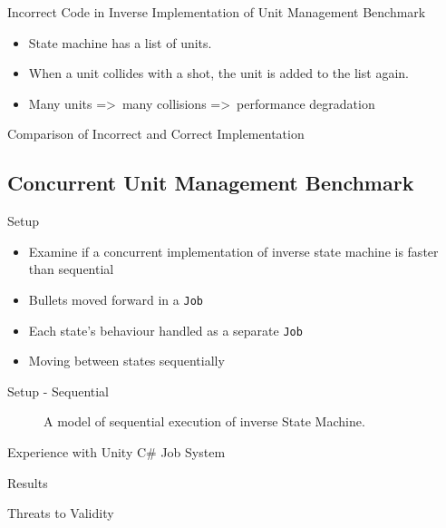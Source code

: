 \begin{frame}{\secname}{\subsecname}
	Incorrect Code in Inverse Implementation of Unit Management Benchmark
	\begin{itemize}
		\item State machine has a list of units.
		\item When a unit collides with a shot, the unit is added to the list again.
		\item Many units =\textgreater\ many collisions =\textgreater\ performance degradation
	\end{itemize} 
\end{frame}

\begin{frame}[fragile]{\secname}{\subsecname}
	Comparison of Incorrect and Correct Implementation
\end{frame}

\subsection{Concurrent Unit Management Benchmark}

\begin{frame}{\secname}{\subsecname}
	Setup
	\begin{itemize}
		\item Examine if a concurrent implementation of inverse state machine is faster than sequential
		\item Bullets moved forward in a \texttt{Job}
		\item Each state's behaviour handled as a separate \texttt{Job}
		\item Moving between states sequentially
	\end{itemize}
\end{frame}

\begin{frame}{\secname}{\subsecname}
	Setup - Sequential
	\begin{figure}[h!]
        \centering
        
        \caption{A model of sequential execution of inverse State Machine.}
    \end{figure}
\end{frame}

\begin{frame}{\secname}{\subsecname}
	Experience with Unity C\# Job System
\end{frame}

\begin{frame}{\secname}{\subsecname}
	Results
\end{frame}

\begin{frame}{\secname}{\subsecname}
	Threats to Validity
\end{frame}